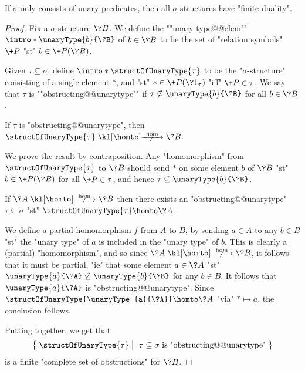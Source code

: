 \begin{property}
	\AP\label{prop:finite-duality-unary-predicates}
	If $\sigma$ only consists of unary predicates, then all $\sigma$-structures
	have "finite duality".
\end{property}	

\begin{proof}
	Fix a $\sigma$-structure $\?B$. We define the \AP""unary type@@elem""
	$\intro*\unaryType{b}{\?B}$ of $b \in \?B$
	to be the set of "relation symbols" $\+P$ "st" $b \in \+P(\?B)$.
	
	Given $\tau \subseteq \sigma$, define \AP$\intro*\structOfUnaryType{\tau}$
	to be the "$\sigma$-structure"
	consisting of a single element $*$, and "st" $* \in \+P(\?1_\tau)$ "iff"
	$\+P \in \tau$.
	We say that $\tau$ is \AP""obstructing@@unarytype"" if
	$\tau \not\subseteq \unaryType{b}{\?B}$ for all $b \in \?B$.

	\begin{claim}
		\AP\label{claim:finite-duality-unary-predicates-direct}
		If $\tau$ is "obstructing@@unarytype",
		then $\structOfUnaryType{\tau} \nothomto \?B$.
	\end{claim}
	We prove the result by contraposition.
	Any "homomorphism" from $\structOfUnaryType{\tau}$ to $\?B$
	should send $*$ on some element $b$ of $\?B$
	"st" $b \in \+P(\?B)$ for all $\+P \in \tau$, and
	hence $\tau \subseteq \unaryType{b}{\?B}$.

	\begin{claim}
		\AP\label{claim:finite-duality-unary-predicates-converse}
		If $\?A \nothomto \?B$ then there exists an "obstructing@@unarytype"
		$\tau \subseteq \sigma$ "st" $\structOfUnaryType{\tau} \homto \?A$.
	\end{claim}
	We define a partial homomorphism $f$ from $A$ to $B$,
	by sending $a \in A$ to any $b \in B$ "st" the "unary type" of $a$
	is included in the "unary type" of $b$. This is clearly a (partial) "homomorphism",
	and so since $\?A \nothomto \?B$, it follows that it must be partial,
	"ie" that some element $a \in \?A$ "st" $\unaryType{a}{\?A} \not\subseteq
	\unaryType{b}{\?B}$ for any $b \in B$. It follows that $\unaryType{a}{\?A}$
	is "obstructing@@unarytype". Since $\structOfUnaryType{\unaryType{a}{\?A}} \homto \?A$
	"via" $* \mapsto a$, the conclusion follows.

	Putting  together, we get that
	\[
		\big\{\;
			\structOfUnaryType{\tau}
			\;\big\vert\;
			\text{ $\tau \subseteq \sigma$ is "obstructing@@unarytype"} 
		\;\big\}
	\]
	is a finite "complete set of obstructions" for $\?B$.
\end{proof}

